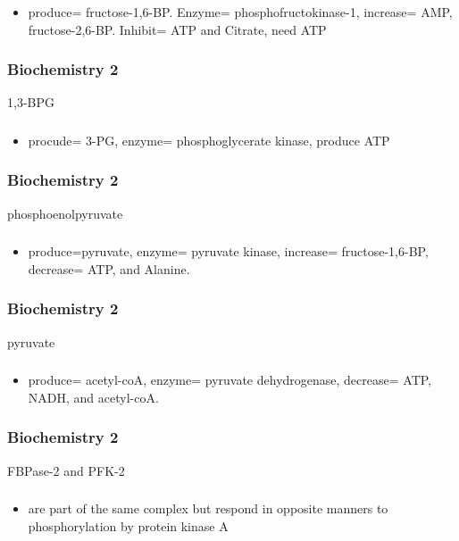 \documentclass[11pt]{beamer}
\begin{document}
\begin{frame}
 \frametitle{}
\begin{itemize}
\item produce= fructose-1,6-BP. Enzyme= phosphofructokinase-1, increase= AMP, fructose-2,6-BP. Inhibit= ATP and Citrate, need ATP 
\end{itemize}
\end{frame}

\begin{frame}
 \frametitle{Biochemistry 2}
1,3-BPG 
\end{frame}

\begin{frame}
 \frametitle{}
\begin{itemize}
\item procude= 3-PG, enzyme= phosphoglycerate kinase, produce ATP 
\end{itemize}
\end{frame}

\begin{frame}
 \frametitle{Biochemistry 2}
phosphoenolpyruvate 
\end{frame}

\begin{frame}
 \frametitle{}
\begin{itemize}
\item produce=pyruvate, enzyme= pyruvate kinase, increase= fructose-1,6-BP, decrease= ATP, and Alanine. 
\end{itemize}
\end{frame}

\begin{frame}
 \frametitle{Biochemistry 2}
pyruvate 
\end{frame}

\begin{frame}
 \frametitle{}
\begin{itemize}
\item produce= acetyl-coA, enzyme= pyruvate dehydrogenase, decrease= ATP, NADH, and acetyl-coA. 
\end{itemize}
\end{frame}

\begin{frame}
 \frametitle{Biochemistry 2}
FBPase-2 and PFK-2 
\end{frame}

\begin{frame}
 \frametitle{}
\begin{itemize}
\item are part of the same complex but respond in opposite manners to phosphorylation by protein kinase A 
\end{itemize}
\end{frame}
\end{document}
